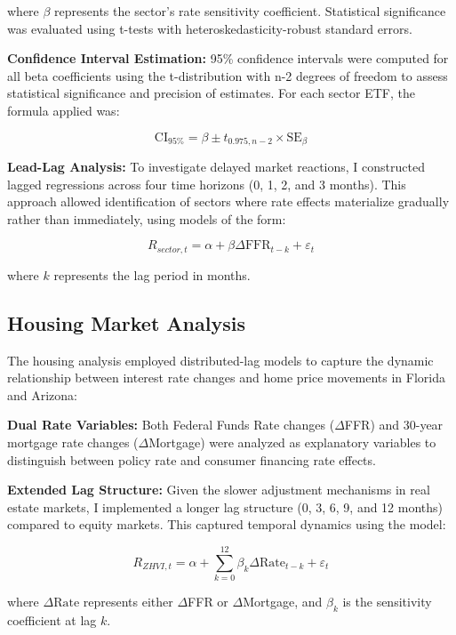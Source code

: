 \documentclass[12pt, stu, abstract]{apa7}
\begin{document}
where $\beta$ represents the sector's rate sensitivity coefficient. Statistical significance was evaluated using t-tests with heteroskedasticity-robust standard errors.

\textbf{Confidence Interval Estimation:} 95\% confidence intervals were computed for all beta coefficients using the t-distribution with n-2 degrees of freedom to assess statistical significance and precision of estimates. For each sector ETF, the formula applied was:

\begin{equation}
\text{CI}_{95\%} = \beta \pm t_{0.975,n-2} \times \text{SE}_{\beta}
\end{equation}

\textbf{Lead-Lag Analysis:} To investigate delayed market reactions, I constructed lagged regressions across four time horizons (0, 1, 2, and 3 months). This approach allowed identification of sectors where rate effects materialize gradually rather than immediately, using models of the form:

\begin{equation}
R_{sector,t} = \alpha + \beta \Delta \text{FFR}_{t-k} + \varepsilon_t
\end{equation}

where $k$ represents the lag period in months.

\subsection{Housing Market Analysis}
The housing analysis employed distributed-lag models to capture the dynamic relationship between interest rate changes and home price movements in Florida and Arizona:

\textbf{Dual Rate Variables:} Both Federal Funds Rate changes ($\Delta$FFR) and 30-year mortgage rate changes ($\Delta$Mortgage) were analyzed as explanatory variables to distinguish between policy rate and consumer financing rate effects.

\textbf{Extended Lag Structure:} Given the slower adjustment mechanisms in real estate markets, I implemented a longer lag structure (0, 3, 6, 9, and 12 months) compared to equity markets. This captured temporal dynamics using the model:

\begin{equation}
R_{ZHVI,t} = \alpha + \sum_{k=0}^{12} \beta_k \Delta \text{Rate}_{t-k} + \varepsilon_t
\end{equation}

where $\Delta \text{Rate}$ represents either $\Delta$FFR or $\Delta$Mortgage, and $\beta_k$ is the sensitivity coefficient at lag $k$.
\end{document}
